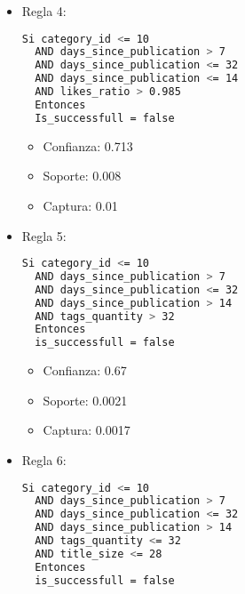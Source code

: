 \begin{itemize}

  \item Regla 4:

\begin{lstlisting}[language=bash, numbers=none]
  Si category_id <= 10
  AND days_since_publication > 7
  AND days_since_publication <= 32
  AND days_since_publication <= 14
  AND likes_ratio > 0.985
  Entonces
  Is_successfull = false
\end{lstlisting}

    \begin{itemize}
      \item Confianza: 0.713
      \item Soporte: 0.008
      \item Captura: 0.01
    \end{itemize}

  \item Regla 5:

\begin{lstlisting}[language=bash, numbers=none]
  Si category_id <= 10
  AND days_since_publication > 7
  AND days_since_publication <= 32
  AND days_since_publication > 14
  AND tags_quantity > 32
  Entonces
  is_successfull = false
\end{lstlisting}

    \begin{itemize}
      \item Confianza: 0.67
      \item Soporte: 0.0021
      \item Captura: 0.0017
    \end{itemize}

  \item Regla 6:

\begin{lstlisting}[language=bash, numbers=none]
  Si category_id <= 10
  AND days_since_publication > 7
  AND days_since_publication <= 32
  AND days_since_publication > 14
  AND tags_quantity <= 32
  AND title_size <= 28
  Entonces
  is_successfull = false
\end{lstlisting}


\end{itemize}
